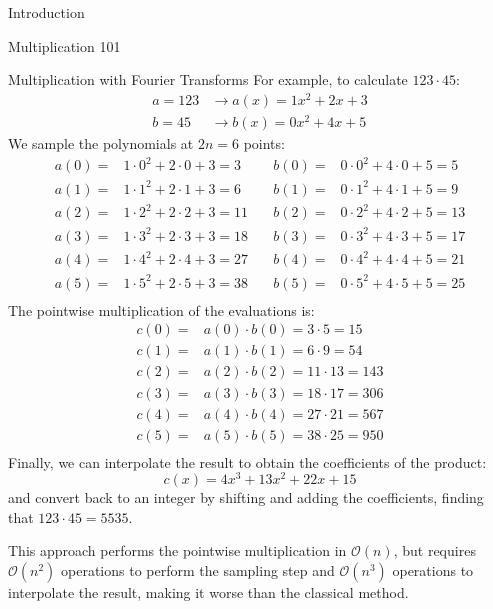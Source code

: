 \documentclass[a4paper,10pt]{article}
\begin{document}
\begin{section}{Introduction}
\begin{subsection}{Multiplication 101}
\begin{subsubsection}{Multiplication with Fourier Transforms}
    For example, to calculate $123\cdot 45$:
    \begin{align*}
        a = 123 &\longrightarrow a(x) = 1x^2 + 2x + 3 \\
        b =  45 &\longrightarrow b(x) = 0x^2 + 4x + 5
    \end{align*}
    We sample the polynomials at $2n = 6$ points:
    \begin{align*}
        a(0) = &1\cdot 0^2 + 2\cdot 0 + 3 = 3 \quad &b(0) = &0\cdot 0^2 + 4\cdot 0 + 5 = 5 \\
        a(1) = &1\cdot 1^2 + 2\cdot 1 + 3 = 6 \quad &b(1) = &0\cdot 1^2 + 4\cdot 1 + 5 = 9 \\
        a(2) = &1\cdot 2^2 + 2\cdot 2 + 3 = 11 \quad &b(2) = &0\cdot 2^2 + 4\cdot 2 + 5 = 13 \\
        a(3) = &1\cdot 3^2 + 2\cdot 3 + 3 = 18 \quad &b(3) = &0\cdot 3^2 + 4\cdot 3 + 5 = 17 \\
        a(4) = &1\cdot 4^2 + 2\cdot 4 + 3 = 27 \quad &b(4) = &0\cdot 4^2 + 4\cdot 4 + 5 = 21 \\
        a(5) = &1\cdot 5^2 + 2\cdot 5 + 3 = 38 \quad &b(5) = &0\cdot 5^2 + 4\cdot 5 + 5 = 25 \\
    \end{align*}
    The pointwise multiplication of the evaluations is:
    \begin{align*}
        c(0) = &a(0)\cdot b(0) = 3\cdot 5 = 15 \\
        c(1) = &a(1)\cdot b(1) = 6\cdot 9 = 54 \\
        c(2) = &a(2)\cdot b(2) = 11\cdot 13 = 143 \\
        c(3) = &a(3)\cdot b(3) = 18\cdot 17 = 306 \\
        c(4) = &a(4)\cdot b(4) = 27\cdot 21 = 567 \\
        c(5) = &a(5)\cdot b(5) = 38\cdot 25 = 950 \\
    \end{align*}
    Finally, we can interpolate the result to obtain the coefficients of the product:
    \begin{equation*}
        c(x) = 4x^3 + 13x^2 + 22x + 15
    \end{equation*}
    and convert back to an integer by shifting and adding the coefficients, finding that $123\cdot 45 = 5535$.
\end{subsubsection}


    This approach performs the pointwise multiplication in $\mathcal{O}(n)$, but requires $\mathcal{O}(n^2)$ operations to perform the sampling step
    and $\mathcal{O}(n^3)$ operations to interpolate the result, making it worse than the classical method.


\end{subsection}
\end{section}
\end{document}

